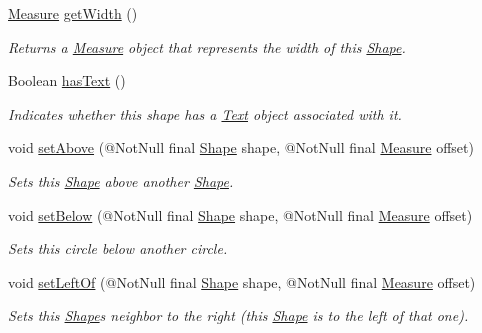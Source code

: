 \begin{DoxyCompactItemize}
\hyperlink{classcom_1_1aarrelaakso_1_1drawl_1_1_measure}{Measure} \hyperlink{classcom_1_1aarrelaakso_1_1drawl_1_1_shape_a3e2c58984f1bcbc2e9e86cf30868561e}{get\+Width} ()
\begin{DoxyCompactList}\small\item\em Returns a \hyperlink{classcom_1_1aarrelaakso_1_1drawl_1_1_measure}{Measure} object that represents the width of this \hyperlink{classcom_1_1aarrelaakso_1_1drawl_1_1_shape}{Shape}. \end{DoxyCompactList}\item 
Boolean \hyperlink{classcom_1_1aarrelaakso_1_1drawl_1_1_shape_a037a5515b2a6e1df1d1981aa5516e78e}{has\+Text} ()
\begin{DoxyCompactList}\small\item\em Indicates whether this shape has a \hyperlink{classcom_1_1aarrelaakso_1_1drawl_1_1_text}{Text} object associated with it. \end{DoxyCompactList}\item 
void \hyperlink{classcom_1_1aarrelaakso_1_1drawl_1_1_shape_aad0b2fb173c0112b71b06cf90709acc3}{set\+Above} (@Not\+Null final \hyperlink{classcom_1_1aarrelaakso_1_1drawl_1_1_shape}{Shape} shape, @Not\+Null final \hyperlink{classcom_1_1aarrelaakso_1_1drawl_1_1_measure}{Measure} offset)
\begin{DoxyCompactList}\small\item\em Sets this \hyperlink{classcom_1_1aarrelaakso_1_1drawl_1_1_shape}{Shape} above another \hyperlink{classcom_1_1aarrelaakso_1_1drawl_1_1_shape}{Shape}. \end{DoxyCompactList}\item 
void \hyperlink{classcom_1_1aarrelaakso_1_1drawl_1_1_shape_a63c902c4e79235901744c6d83544fa54}{set\+Below} (@Not\+Null final \hyperlink{classcom_1_1aarrelaakso_1_1drawl_1_1_shape}{Shape} shape, @Not\+Null final \hyperlink{classcom_1_1aarrelaakso_1_1drawl_1_1_measure}{Measure} offset)
\begin{DoxyCompactList}\small\item\em Sets this circle below another circle. \end{DoxyCompactList}\item 
void \hyperlink{classcom_1_1aarrelaakso_1_1drawl_1_1_shape_a8012a3823982d77b563ef61787ccb523}{set\+Left\+Of} (@Not\+Null final \hyperlink{classcom_1_1aarrelaakso_1_1drawl_1_1_shape}{Shape} shape, @Not\+Null final \hyperlink{classcom_1_1aarrelaakso_1_1drawl_1_1_measure}{Measure} offset)
\begin{DoxyCompactList}\small\item\em Sets this \hyperlink{classcom_1_1aarrelaakso_1_1drawl_1_1_shape}{Shape}\textquotesingle{}s neighbor to the right (this \hyperlink{classcom_1_1aarrelaakso_1_1drawl_1_1_shape}{Shape} is to the left of that one). \end{DoxyCompactList}\item 

\end{DoxyCompactItemize}
